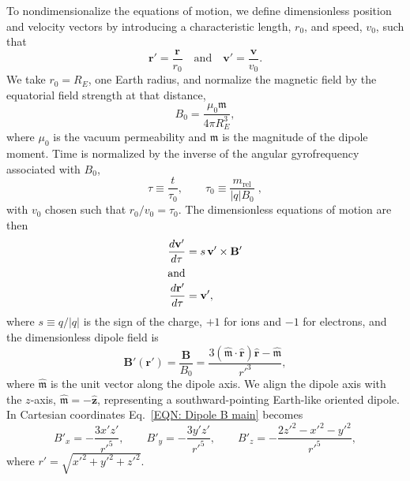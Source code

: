 \documentclass[draft]{agujournal2019}
\begin{document}
To nondimensionalize the equations of motion, we define dimensionless position and velocity vectors by introducing a characteristic length, $r_0$, and speed,
$v_0$, such that
        \begin{equation*}
            \mathbf{r'}=\frac{\mathbf{r}}{r_0}\quad\mbox{and}\quad
            \mathbf{v'}=\frac{\mathbf{v}}{v_0}.
        \end{equation*}
We take $r_0 = R_E$, one Earth radius, and normalize the magnetic field by the equatorial field strength at that distance,
        \begin{equation*}
            B_0 = \frac{\mu_0 \mathfrak{m}}{4\pi R_E^3},
        \end{equation*}
where $\mu_0$ is the vacuum permeability and $\mathfrak{m}$ is the magnitude of the dipole moment. Time is normalized by the inverse of the angular gyrofrequency associated with $B_0$,
        \begin{equation*}
            \tau\equiv\frac{t}{\tau_0},\qquad
            \tau_0\equiv\frac{m_{\text{rel}}}{|q|B_0}\;,
        \end{equation*}
with $v_0$ chosen such that $r_0/v_0=\tau_0$. The dimensionless equations of motion are then
        \begin{align}
            \frac{d\mathbf{v'}}{d\tau} &= s\,\mathbf{v'}\times \mathbf{B'}
            \label{EQN: Rep Lorentz}\\
        \intertext{and}
            \frac{d\mathbf{r'}}{d\tau} &= \mathbf{v'},
            \label{EQN: Rep dr/dt}
        \end{align}
where $s \equiv q/|q|$ is the sign of the charge, $+1$ for ions and $-1$ for electrons, and the dimensionless dipole field is
        \begin{equation}
            \mathbf{B'}(\mathbf{r'})=\frac{\mathbf{B}}{B_0}
            =\frac{3(\hat{\boldsymbol{\mathfrak{m}}}\cdot\hat{\mathbf{r}})\hat{\mathbf{r}}
            - \hat{\boldsymbol{\mathfrak{m}}}}{r'^3},
            \label{EQN: Dipole B main}
        \end{equation}
where $\hat{\boldsymbol{\mathfrak{m}}}$ is the unit vector along the dipole axis. We align the dipole axis with the $z$-axis, $\hat{\boldsymbol{\mathfrak{m}}} = -\hat{\mathbf{z}}$, representing a southward-pointing Earth-like oriented dipole. In Cartesian coordinates Eq.~\eqref{EQN: Dipole B main} becomes
        \begin{equation}
            B'_x = -\frac{3x'z'}{r'^5}, \qquad
            B'_y = -\frac{3y'z'}{r'^5}, \qquad
            B'_z = -\frac{2z'^2 - x'^2 - y'^2}{r'^5},
            \label{EQN: Dipole B components}
        \end{equation}
where $r' = \sqrt{x'^2 + y'^2 + z'^2}$. 
\end{document}
